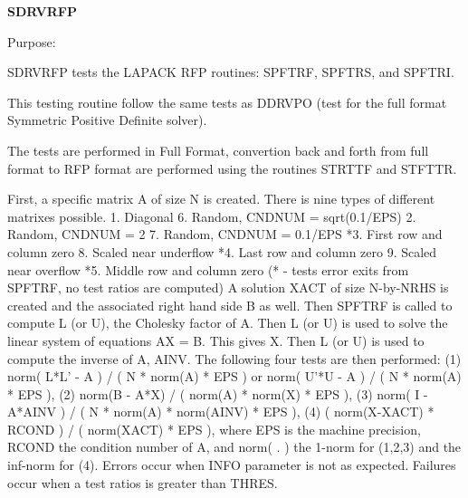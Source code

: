 {\bfseries S\+D\+R\+V\+R\+F\+P} 

\begin{DoxyParagraph}{Purpose\+: }
\begin{DoxyVerb} SDRVRFP tests the LAPACK RFP routines:
     SPFTRF, SPFTRS, and SPFTRI.

 This testing routine follow the same tests as DDRVPO (test for the full
 format Symmetric Positive Definite solver).

 The tests are performed in Full Format, convertion back and forth from
 full format to RFP format are performed using the routines STRTTF and
 STFTTR.

 First, a specific matrix A of size N is created. There is nine types of 
 different matrixes possible.
  1. Diagonal                        6. Random, CNDNUM = sqrt(0.1/EPS)
  2. Random, CNDNUM = 2              7. Random, CNDNUM = 0.1/EPS
 *3. First row and column zero       8. Scaled near underflow
 *4. Last row and column zero        9. Scaled near overflow
 *5. Middle row and column zero
 (* - tests error exits from SPFTRF, no test ratios are computed)
 A solution XACT of size N-by-NRHS is created and the associated right
 hand side B as well. Then SPFTRF is called to compute L (or U), the
 Cholesky factor of A. Then L (or U) is used to solve the linear system
 of equations AX = B. This gives X. Then L (or U) is used to compute the
 inverse of A, AINV. The following four tests are then performed:
 (1) norm( L*L' - A ) / ( N * norm(A) * EPS ) or
     norm( U'*U - A ) / ( N * norm(A) * EPS ),
 (2) norm(B - A*X) / ( norm(A) * norm(X) * EPS ),
 (3) norm( I - A*AINV ) / ( N * norm(A) * norm(AINV) * EPS ),
 (4) ( norm(X-XACT) * RCOND ) / ( norm(XACT) * EPS ),
 where EPS is the machine precision, RCOND the condition number of A, and
 norm( . ) the 1-norm for (1,2,3) and the inf-norm for (4).
 Errors occur when INFO parameter is not as expected. Failures occur when
 a test ratios is greater than THRES.\end{DoxyVerb}
 
\end{DoxyParagraph}

